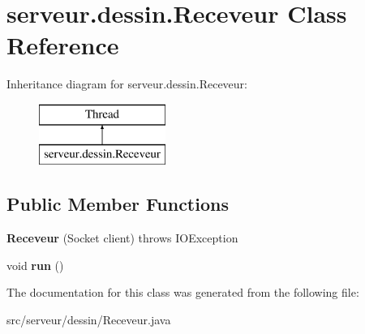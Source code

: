 \hypertarget{classserveur_1_1dessin_1_1_receveur}{}\section{serveur.\+dessin.\+Receveur Class Reference}
\label{classserveur_1_1dessin_1_1_receveur}
Inheritance diagram for serveur.\+dessin.\+Receveur\+:\begin{figure}[H]
\begin{center}
\leavevmode
\includegraphics[height=2.000000cm]{d8/ddb/classserveur_1_1dessin_1_1_receveur}
\end{center}
\end{figure}
\subsection*{Public Member Functions}
\begin{DoxyCompactItemize}
\item 
\mbox{\label{classserveur_1_1dessin_1_1_receveur_a3892a18f449d0ef492302513c9e4b85f}} 
{\bfseries Receveur} (Socket client)  throws I\+O\+Exception 
\item 
\mbox{\label{classserveur_1_1dessin_1_1_receveur_a4dc31908416357009120361ae5bd72d1}} 
void {\bfseries run} ()
\end{DoxyCompactItemize}


The documentation for this class was generated from the following file\+:\begin{DoxyCompactItemize}
\item 
src/serveur/dessin/Receveur.\+java\end{DoxyCompactItemize}
